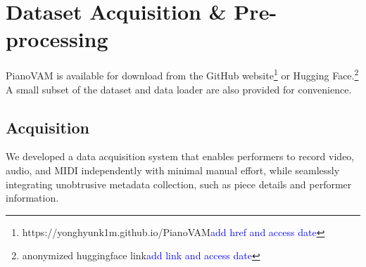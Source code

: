 \documentclass{article}
\newcommand{\alex}[1]{\textcolor{blue}{#1}}%
\begin{document}
\section{Dataset Acquisition \& Pre-processing}\label{sec:dataset-acquisition-preprocessing}
PianoVAM is available for download from the GitHub website\footnote{https://yonghyunk1m.github.io/PianoVAM\label{github-link}\alex{add href and access date}} or Hugging Face.\footnote{anonymized huggingface link\alex{add link and access date}} A small subset of the dataset and data loader are also provided for convenience.

\subsection{Acquisition}

We developed a data acquisition system that enables performers to record video, audio, and MIDI independently with minimal manual effort, while seamlessly integrating unobtrusive metadata collection, such as piece details and performer information.  
 

\end{document}
